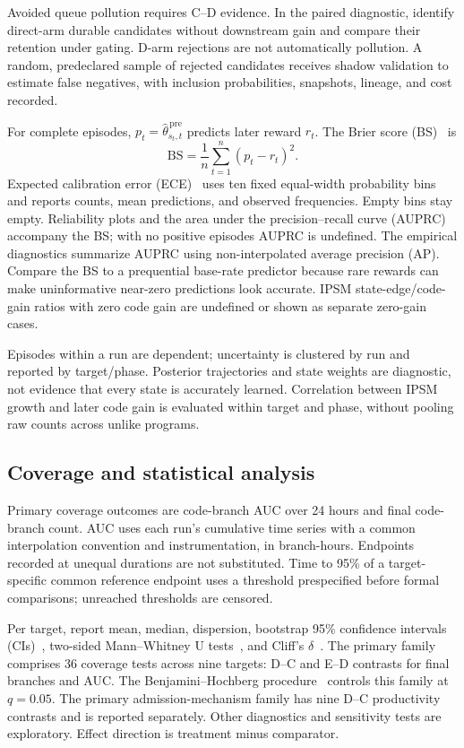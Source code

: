 \documentclass[final,5p,times,number]{elsarticle}
\begin{document}
Avoided queue pollution requires C--D evidence. In the paired diagnostic, identify direct-arm durable candidates without downstream gain and compare their retention under gating. D-arm rejections are not automatically pollution. A random, predeclared sample of rejected candidates receives shadow validation to estimate false negatives, with inclusion probabilities, snapshots, lineage, and cost recorded.

For complete episodes, $p_t=\widehat{\theta}_{s_t,t}^{\,\mathrm{pre}}$ predicts later reward $r_t$. The Brier score (BS)~\cite{brier1950} is
\begin{equation}
\mathrm{BS}=\frac{1}{n}\sum_{t=1}^{n}(p_t-r_t)^2.
\end{equation}
Expected calibration error (ECE)~\cite{guo2017calibration} uses ten fixed equal-width probability bins and reports counts, mean predictions, and observed frequencies. Empty bins stay empty. Reliability plots and the area under the precision--recall curve (AUPRC)~\cite{davis2006pr} accompany the BS; with no positive episodes AUPRC is undefined. The empirical diagnostics summarize AUPRC using non-interpolated average precision (AP). Compare the BS to a prequential base-rate predictor because rare rewards can make uninformative near-zero predictions look accurate. IPSM state-edge/code-gain ratios with zero code gain are undefined or shown as separate zero-gain cases.

Episodes within a run are dependent; uncertainty is clustered by run and reported by target/phase. Posterior trajectories and state weights are diagnostic, not evidence that every state is accurately learned. Correlation between IPSM growth and later code gain is evaluated within target and phase, without pooling raw counts across unlike programs.

\subsection{Coverage and statistical analysis}
Primary coverage outcomes are code-branch AUC over 24 hours and final code-branch count. AUC uses each run's cumulative time series with a common interpolation convention and instrumentation, in branch-hours. Endpoints recorded at unequal durations are not substituted. Time to 95\% of a target-specific common reference endpoint uses a threshold prespecified before formal comparisons; unreached thresholds are censored.

Per target, report mean, median, dispersion, bootstrap 95\% confidence intervals (CIs)~\cite{efron1979}, two-sided Mann--Whitney U tests~\cite{mann1947}, and Cliff's $\delta$~\cite{cliff1993}. The primary family comprises 36 coverage tests across nine targets: D--C and E--D contrasts for final branches and AUC. The Benjamini--Hochberg procedure~\cite{benjamini1995} controls this family at $q=0.05$. The primary admission-mechanism family has nine D--C productivity contrasts and is reported separately. Other diagnostics and sensitivity tests are exploratory. Effect direction is treatment minus comparator.
\end{document}
